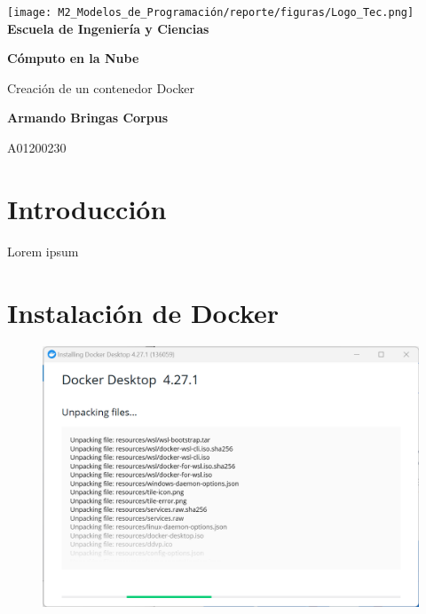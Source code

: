 \documentclass[12pt,a4paper]{article}
\begin{document}
\begin{titlepage}
    \centering
    \texttt{[image: M2\_Modelos\_de\_Programación/reporte/figuras/Logo\_Tec.png]}\\
    \vspace{.5cm}
    \bfseries\large Escuela de Ingeniería y Ciencias
        
    \vspace{5cm}
    \centering
    \textbf{\Huge Cómputo en la Nube}
    \vspace{0.5cm}
        
    {\Large Creación de un contenedor Docker}

    \vspace{5cm}
        
    \textbf{\LARGE Armando Bringas Corpus}
        
    \vspace{0.5cm}
        
    {\large A01200230}
        
    \vfill
        
\end{titlepage}

\section{Introducción}

Lorem ipsum

\section{Instalación de Docker}

\begin{figure}[H]
    \centering
    \includegraphics[width=1\linewidth]{M3_Virtualización_y_Contenedores/Tarea_3_Creación_Contenedor_Docker/reporte/figuras/2-1_Instalación_Docker.png}
    \label{fig:Instalación_Docker_1}
\end{figure}
\end{document}
